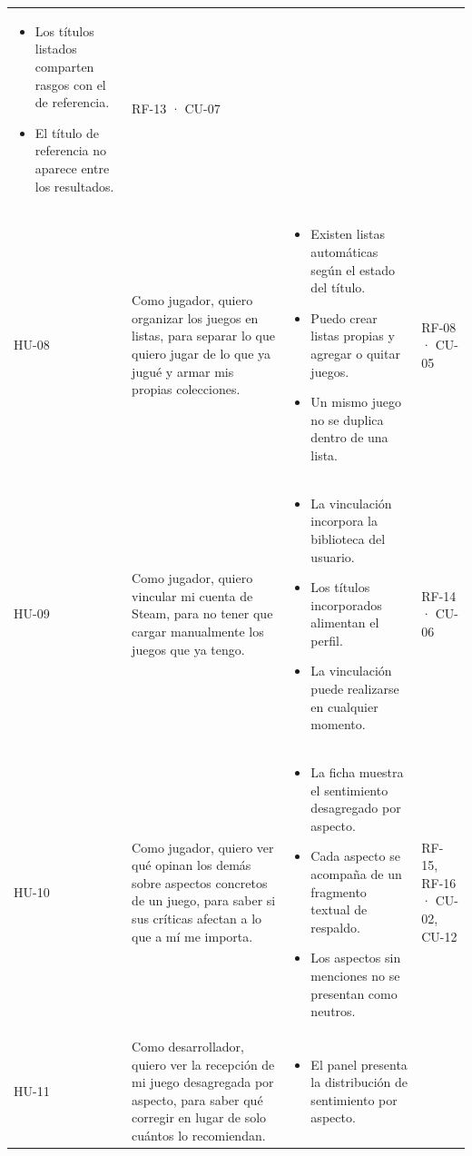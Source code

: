 \begin{longtable}{|>{\raggedright\arraybackslash}p{1cm}|>{\raggedright\arraybackslash}p{4.6cm}|>{\raggedright\arraybackslash}p{5.2cm}|>{\raggedright\arraybackslash}p{2cm}|}
\begin{itemize}[leftmargin=1em, itemsep=1pt, topsep=1pt]
		\item Los títulos listados comparten rasgos con el de referencia.
		\item El título de referencia no aparece entre los resultados.
	\end{itemize} & RF-13 · CU-07 \\
	HU-08 & Como jugador, quiero organizar los juegos en listas, para separar lo que quiero jugar de lo que ya jugué y armar mis propias colecciones. &
	\begin{itemize}[leftmargin=1em, itemsep=1pt, topsep=1pt]
		\item Existen listas automáticas según el estado del título.
		\item Puedo crear listas propias y agregar o quitar juegos.
		\item Un mismo juego no se duplica dentro de una lista.
	\end{itemize} & RF-08 · CU-05 \\
	HU-09 & Como jugador, quiero vincular mi cuenta de Steam, para no tener que cargar manualmente los juegos que ya tengo. &
	\begin{itemize}[leftmargin=1em, itemsep=1pt, topsep=1pt]
		\item La vinculación incorpora la biblioteca del usuario.
		\item Los títulos incorporados alimentan el perfil.
		\item La vinculación puede realizarse en cualquier momento.
	\end{itemize} & RF-14 · CU-06 \\
	HU-10 & Como jugador, quiero ver qué opinan los demás sobre aspectos concretos de un juego, para saber si sus críticas afectan a lo que a mí me importa. &
	\begin{itemize}[leftmargin=1em, itemsep=1pt, topsep=1pt]
		\item La ficha muestra el sentimiento desagregado por aspecto.
		\item Cada aspecto se acompaña de un fragmento textual de respaldo.
		\item Los aspectos sin menciones no se presentan como neutros.
	\end{itemize} & RF-15, RF-16 · CU-02, CU-12 \\
	HU-11 & Como desarrollador, quiero ver la recepción de mi juego desagregada por aspecto, para saber qué corregir en lugar de solo cuántos lo recomiendan. &
	\begin{itemize}[leftmargin=1em, itemsep=1pt, topsep=1pt]
		\item El panel presenta la distribución de sentimiento por aspecto.

\end{itemize}
\end{longtable}
